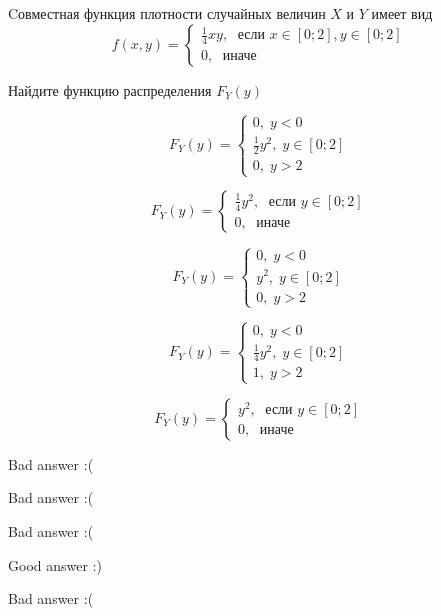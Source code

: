 
\begin{question}
Cовместная функция плотности случайных величин \(X\) и \(Y\) имеет вид
\[
f(x,y)=\begin{cases}
\frac{1}{4}xy, \; \text{ если } x\in[0;2], y\in [0;2] \\
0, \; \text{ иначе}
\end{cases}
\]

Найдите функцию распределения \(F_Y(y)\)
\begin{answerlist}
  \item \[F_Y(y)=\begin{cases} 0, \;  y < 0 \\ \frac{1}{2}y^2, \; y\in [0;2] \\ 0, \; y > 2 \end{cases}\]
  \item \[F_Y(y)=\begin{cases} \frac{1}{4}y^2, \; \text{ если } y\in [0;2] \\ 0, \; \text{ иначе} \end{cases}\]
  \item \[F_Y(y)=\begin{cases} 0, \;  y < 0 \\ y^2, \; y\in [0;2] \\ 0, \; y > 2 \end{cases}\]
  \item \[F_Y(y)=\begin{cases} 0, \;  y < 0 \\ \frac{1}{4}y^2, \; y\in [0;2] \\ 1, \; y > 2 \end{cases}\]
  \item \[F_Y(y)=\begin{cases} y^2, \; \text{ если } y\in [0;2] \\ 0, \; \text{ иначе} \end{cases}\]
\end{answerlist}
\end{question}

\begin{solution}
\begin{answerlist}
  \item Bad answer :(
  \item Bad answer :(
  \item Bad answer :(
  \item Good answer :)
  \item Bad answer :(
\end{answerlist}
\end{solution}

